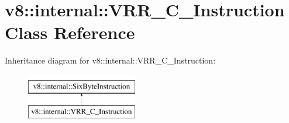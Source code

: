 \hypertarget{classv8_1_1internal_1_1VRR__C__Instruction}{}\section{v8\+:\+:internal\+:\+:V\+R\+R\+\_\+\+C\+\_\+\+Instruction Class Reference}
\label{classv8_1_1internal_1_1VRR__C__Instruction}
Inheritance diagram for v8\+:\+:internal\+:\+:V\+R\+R\+\_\+\+C\+\_\+\+Instruction\+:\begin{figure}[H]
\begin{center}
\leavevmode
\includegraphics[height=2.000000cm]{classv8_1_1internal_1_1VRR__C__Instruction}
\end{center}
\end{figure}
